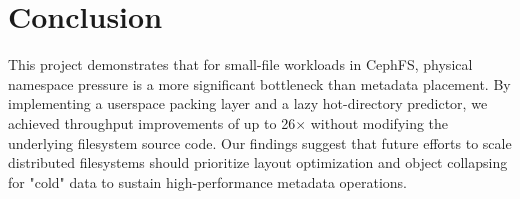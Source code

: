 \documentclass[letterpaper,twocolumn,10pt]{article}
\begin{document}
\section{Conclusion}

This project demonstrates that for small-file workloads in CephFS, physical namespace pressure is a more significant bottleneck than metadata placement. By implementing a userspace packing layer and a lazy hot-directory predictor, we achieved throughput improvements of up to 26$\times$ without modifying the underlying filesystem source code. Our findings suggest that future efforts to scale distributed filesystems should prioritize layout optimization and object collapsing for "cold" data to sustain high-performance metadata operations.



\end{document}
